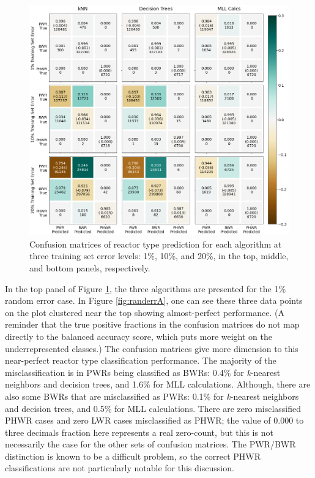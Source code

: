 \begin{figure}[!htb]
  \centering
  \includegraphics[width=\textwidth]{./chapters/exp1/confusion_matrix_nuc29_3errs.png}
  \caption{Confusion matrices of reactor type prediction for each algorithm 
           at three training set error levels: 1\%, 10\%, and 20\%, in the 
           top, middle, and bottom panels, respectively.}
  \label{fig:cm_nuc29}
\end{figure}

In the top panel of Figure \ref{fig:cm_nuc29}, the three algorithms are
presented for the 1\% random error case. In Figure \ref{fig:randerrA}, one can
see these three data points on the plot clustered near the top showing
almost-perfect performance.  (A reminder that the true positive fractions in
the confusion matrices do not map directly to the balanced accuracy score,
which puts more weight on the underrepresented classes.) The confusion matrices
give more dimension to this near-perfect reactor type classification
performance. The majority of the misclassification is in \gls{PWR}s being
classified as \gls{BWR}s: 0.4\% for \textit{k}-nearest neighbors and decision
trees, and 1.6\% for \gls{MLL} calculations. Although, there are also some
\gls{BWR}s that are misclassified as \gls{PWR}s: 0.1\% for \textit{k}-nearest
neighbors and decision trees, and 0.5\% for \gls{MLL} calculations.  There are
zero misclassified \gls{PHWR} cases and zero \gls{LWR} cases misclassified as
\gls{PHWR}; the value of 0.000 to three decimals fraction here represents a
real zero-count, but this is not necessarily the case for the other sets of
confusion matrices.  The \gls{PWR}/\gls{BWR} distinction is known to be a
difficult problem, so the correct \gls{PHWR}
classifications are not particularly notable for this discussion. 

